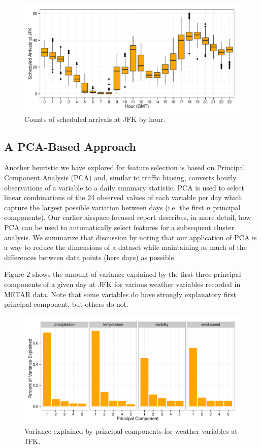 \documentclass[11pt]{scrartcl}
\begin{document}
\begin{figure}[htbp]
\begin{center}
\includegraphics[scale=0.8125]{./figures/Fig1.pdf}
\caption{Counts of scheduled arrivals at JFK by hour.}
\label{default}
\end{center}
\end{figure}

\subsection{A PCA-Based Approach}
Another heuristic we have explored for feature selection is based on Principal Component Analysis (PCA) and, similar to traffic biasing, converts hourly observations of a variable to a daily summary statistic.  PCA is used to select linear combinations of the 24 observed values of each variable per day which capture the largest possible variation between days (i.e. the first $n$ principal components).  Our earlier airspace-focused report describes, in more detail, how PCA can be used to automatically select features for a subsequent cluster analysis.  We summarize that discussion by noting that our application of PCA is a way to reduce the dimensions of a dataset while maintaining as much of the differences between data points (here days) as possible.

Figure 2 shows the amount of variance explained by the first three principal components of a given day at JFK for various weather variables recorded in METAR data.  Note that some variables do have strongly explanatory first principal component, but others do not.

\begin{figure}[htbp]
\begin{center}
\includegraphics[scale=0.8125]{./figures/Fig2.pdf}
\caption{Variance explained by principal components for weather variables at JFK.}
\label{default}
\end{center}
\end{figure}
\end{document}
